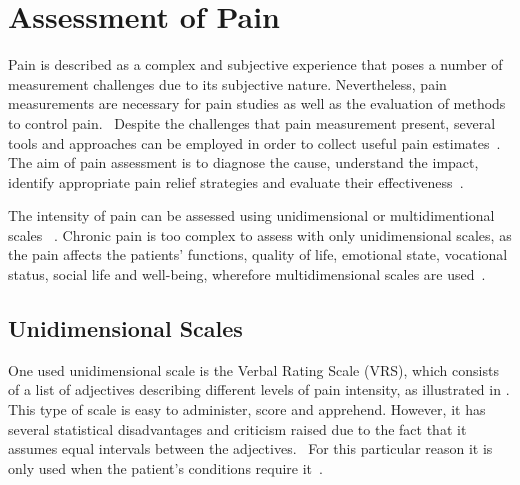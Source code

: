 \section{Assessment of Pain}
Pain is described as a complex and subjective experience that poses a number of measurement challenges due to its subjective nature. Nevertheless, pain measurements are necessary for pain studies as well as the evaluation of methods to control pain.~\cite{Jensen2001} %
Despite the challenges that pain measurement present, several tools and approaches can be employed in order to collect useful pain estimates~\cite{Younger2010}. The aim of pain assessment is to diagnose the cause, understand the impact, identify appropriate pain relief strategies and evaluate their effectiveness~\cite{Briggs2010}.


The intensity of pain can be assessed using unidimensional or multidimentional scales ~\cite{Jensen2001}.
Chronic pain is too complex to assess with only unidimensional scales, as the pain affects the patients' functions, quality of life, emotional state, vocational status, social life and well-being, wherefore multidimensional scales are used~\cite{Ebert2010}. 


\subsection{Unidimensional Scales}
One used unidimensional scale is the Verbal Rating Scale (VRS), which consists of a list of adjectives describing different levels of pain intensity, as illustrated in . This type of scale is easy to administer, score and apprehend. However, it has several statistical disadvantages and criticism raised due to the fact that it assumes equal intervals between the adjectives.~\cite{Jensen2001} For this particular reason it is only used when the patient's conditions require it~\cite{Jensen1986}. 

